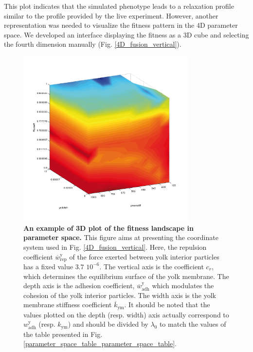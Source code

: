 This plot indicates that the simulated phenotype leads to a relaxation profile similar to the profile provided by the live experiment. However, another representation was needed to visualize the fitness pattern in the 4D parameter space. We developed an interface displaying the fitness as a 3D cube and selecting the fourth dimension manually (Fig. \ref{4D_fusion_vertical}).
\begin{figure}
\begin{center}
\includegraphics[width=0.8\textwidth]{../../images/Cases_Studies/Case_0_Yolk/4D/single_3D_plot.png}
\end{center}
\caption{\textbf{An example of 3D plot of the fitness landscape in parameter space.} This figure aims at presenting the coordinate system used in Fig. \ref{4D_fusion_vertical}. Here, the repulsion coefficient $\overline{w}^{\mathrm{y}}_{\mathrm{rep}}$ of the force exerted between yolk interior particles has a fixed value $3.7$ $10^{-6}$. The vertical axis is the coefficient $c_r$, which determines the equilibrium surface of the yolk membrane. The depth axis is the adhesion coefficient, $\overline{w}^{\mathrm{y}}_{\mathrm{adh}}$ which modulates the cohesion of the yolk interior particles. The width axis is the yolk membrane stiffness coefficient $\overline{k}_{\mathrm{ym}}$. It should be noted that the values plotted on the depth (resp. width) axis actually correspond to $w^{\mathrm{y}}_{\mathrm{adh}}$ (resp. $ k_{\mathrm{ym}}$) and should be divided by $\lambda_0$ to match the values of the table presented in Fig. \ref{parameter_space_table_parameter_space_table}.  }
\label{4D_single_3D_plot}
\end{figure}
